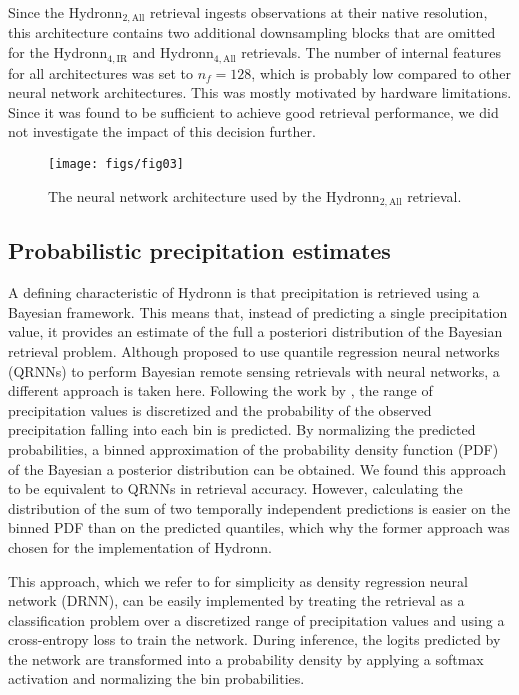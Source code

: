 \documentclass[journal abbreviation, manuscript]{copernicus}
\newcommand{\hydronntwo}{Hydronn$_{2, \text{All}}$}
\newcommand{\hydronnfourall}{Hydronn$_{4, \text{All}}$}
\newcommand{\hydronnfourir}{Hydronn$_{4, \text{IR}}$}
\begin{document}
Since the \hydronntwo{} retrieval ingests observations at their native
resolution, this architecture contains two additional downsampling blocks that
are omitted for the \hydronnfourir{} and \hydronnfourall{} retrievals. The
number of internal features for all architectures was set to $n_f = 128$, which
is probably low compared to other neural network architectures. This was mostly
motivated by hardware limitations. Since it was found to be sufficient to
achieve good retrieval performance, we did not investigate the impact of this
decision further.

\begin{figure}[hbpt!]
  \centering
  \texttt{[image: figs/fig03]}
  \caption{
    The neural network architecture used by the \hydronntwo{} retrieval.
  }
  \label{fig:architecture}
\end{figure}

\subsection{Probabilistic precipitation estimates} 

A defining characteristic of Hydronn is that precipitation is retrieved using a
Bayesian framework. This means that, instead of predicting a single precipitation
value, it provides an estimate of the full a posteriori distribution of the
Bayesian retrieval problem. Although \citet{pfreundschuh18} proposed to use
quantile regression neural networks (QRNNs) to perform Bayesian remote sensing
retrievals with neural networks, a different approach is taken here. Following
the work by \citet{sonderby20}, the range of precipitation values is discretized
and the probability of the observed precipitation falling into each bin is
predicted. By normalizing the predicted probabilities, a binned approximation of
the probability density function (PDF) of the Bayesian a posterior distribution
can be obtained. We found this approach to be equivalent to QRNNs in retrieval
accuracy. However, calculating the distribution of the sum of two temporally
independent predictions is easier on the binned PDF than on the predicted
quantiles, which why the former approach was chosen for the implementation of
Hydronn.

This approach, which we refer to for simplicity as density regression neural
network (DRNN), can be easily implemented by treating the retrieval as a
classification problem over a discretized range of precipitation values and
using a cross-entropy loss to train the network. During inference, the logits
predicted by the network are transformed into a probability density by applying
a softmax activation and normalizing the bin probabilities.
\end{document}
